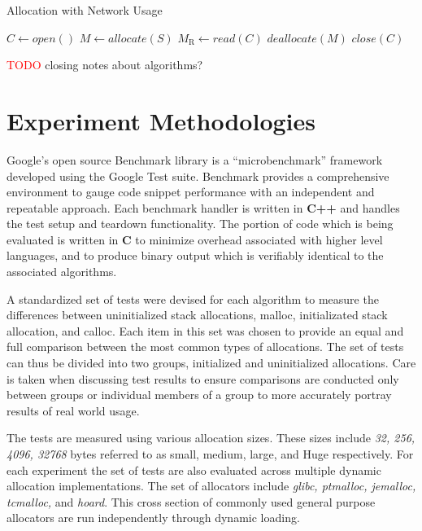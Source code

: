 \documentclass[letterpaper, 10 pt, conference]{ieeeconf}  %
\newcommand*\todo[0]{\textcolor{red}{TODO }}
\begin{document}
\begin{algorithm}[h]
  \caption{Allocation with Network Usage}
  \begin{algorithmic}
    \STATE $C \leftarrow open()$
      \STATE $M \leftarrow allocate(S)$
      \STATE $M_\text{R} \leftarrow read(C)$
      \STATE $deallocate(M)$
    \ENDWHILE
    \STATE $close(C)$
  \end{algorithmic}
  \label{network_usage_algorithm}
\end{algorithm}

\todo closing notes about algorithms?

\section{Experiment Methodologies}
Google's open source Benchmark library is a ``microbenchmark'' framework developed using the Google Test suite.
Benchmark provides a comprehensive environment to gauge code snippet performance with an independent and repeatable approach.
Each benchmark handler is written in \textbf{C++} and handles the test setup and teardown functionality.
The portion of code which is being evaluated is written in \textbf{C} to minimize overhead associated with higher level languages, and to produce binary output which is verifiably identical to the associated algorithms.

A standardized set of tests were devised for each algorithm to measure the differences between uninitialized stack allocations, malloc, initializated stack allocation, and calloc.
Each item in this set was chosen to provide an equal and full comparison between the most common types of allocations.
The set of tests can thus be divided into two groups, initialized and uninitialized allocations.
Care is taken when discussing test results to ensure comparisons are conducted only between groups or individual members of a group to more accurately portray results of real world usage. 

The tests are measured using various allocation sizes.
These sizes include \textit{32, 256, 4096, 32768} bytes referred to as small, medium, large, and Huge respectively.
For each experiment the set of tests are also evaluated across multiple dynamic allocation implementations.
The set of allocators include \textit{glibc, ptmalloc, jemalloc, tcmalloc,} and \textit{hoard}.
This cross section of commonly used general purpose allocators are run independently through dynamic loading.
\end{document}
